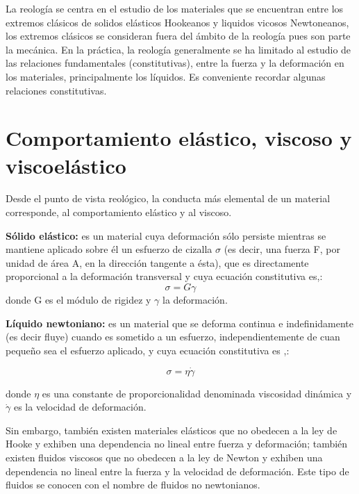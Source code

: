 \documentclass[review]{elsarticle}
\begin{document}
La reolog\'ia se centra en el estudio de los materiales que se encuentran entre los extremos cl\'asicos de solidos el\'asticos Hookeanos y liquidos vicosos Newtoneanos, los extremos cl\'asicos se consideran fuera del \'ambito de la reolog\'ia pues son parte la mec\'anica.
En la pr\'actica, la reolog\'ia generalmente se ha limitado al estudio de las relaciones fundamentales (constitutivas), entre la fuerza y la deformaci\'on en los materiales, principalmente los l\'iquidos. Es conveniente recordar algunas relaciones constitutivas.

\section{Comportamiento el\'astico, viscoso y viscoel\'astico}
Desde el punto de vista reol\'ogico, la conducta m\'as elemental de un material corresponde, al comportamiento el\'astico y al viscoso.

\textbf{S\'olido el\'astico:} es un material cuya deformaci\'on s\'olo persiste mientras se mantiene aplicado sobre \'el un esfuerzo de cizalla $\sigma $ (es decir, una fuerza F, por unidad de \'area A, en la direcci\'on tangente a \'esta), que es directamente proporcional a la deformaci\'on transversal y cuya ecuaci\'on constitutiva es\cite{Barnes1989},\cite{1560815795}:
\begin{equation}\sigma  =G \gamma  \label{Lopez 2.33}
\end{equation}
donde G es el m\'odulo de rigidez y $\gamma $ la deformaci\'on.

\textbf{L\'iquido newtoniano:} es un material que se deforma continua e indefinidamente (es decir fluye) cuando es sometido a un esfuerzo, independientemente de cuan peque{\~n}o sea el esfuerzo aplicado, y cuya ecuaci\'on constitutiva es \cite{Barnes1989},\cite{1560815795}:

\begin{equation}\sigma  =\eta  \dot{\gamma } \label{Lopen 2.34}
\end{equation}

donde $\eta $ es una constante de proporcionalidad denominada viscosidad din\'amica y $\dot{\gamma }$ es la velocidad de deformaci\'on.

Sin embargo, tambi\'en existen materiales el\'asticos que no obedecen a la ley de Hooke y exhiben una dependencia no lineal entre fuerza y deformaci\'on; tambi\'en existen fluidos viscosos que no obedecen a la ley de Newton y exhiben una dependencia no lineal entre la fuerza y la velocidad de deformaci\'on. Este tipo de fluidos se conocen con el nombre de fluidos no newtonianos.
\end{document}
